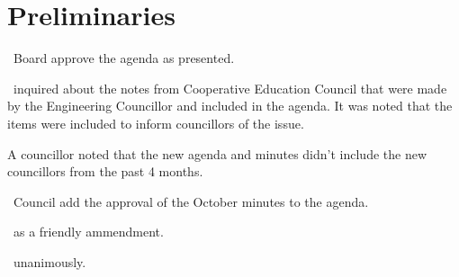 \section*{Preliminaries}

\begin{information}
\end{information}

\begin{motion}
    \birt\ Board approve the agenda as presented.
    \movers{\seneca}{\jennifer}

    \vped\ inquired about the notes from Cooperative Education Council that
    were made by the Engineering Councillor and included in the agenda. It
    was noted that the items were included to inform councillors of the issue. 

    A councillor noted that the new agenda and minutes didn't include the new
    councillors from the past 4 months. 

    \begin{motion}
        \birt\ Council add the approval of the October minutes to the agenda. 
        \movers{\tristan}{\seneca}

        \carries\ as a friendly ammendment.
    \end{motion}

    \carries\ unanimously.
\end{motion}
